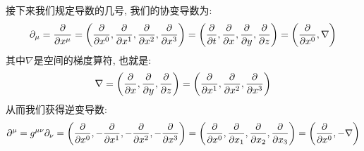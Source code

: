 接下来我们规定导数的几号, 我们的协变导数为:
\begin{equation}
  \partial_\mu = \frac{\partial}{\partial x^\mu} = \left( \frac{\partial}{\partial x^0}, \frac{\partial}{\partial x^1}, \frac{\partial}{\partial x^2}, \frac{\partial}{\partial x^3} \right) = \left( \frac{\partial}{\partial t}, \frac{\partial}{\partial x}, \frac{\partial}{\partial y}, \frac{\partial}{\partial z} \right) = \left(\pdv{}{x^0}, \nabla\right)
\end{equation}
其中$\nabla$是空间的梯度算符, 也就是:
\begin{equation}
  \nabla = \left( \frac{\partial}{\partial x}, \frac{\partial}{\partial y}, \frac{\partial}{\partial z} \right) = \left( \pdv{}{x^1}, \pdv{}{x^2}, \pdv{}{x^3} \right)
\end{equation}
从而我们获得逆变导数:
\begin{equation}
  \partial^\mu = g^{\mu\nu} \partial_\nu = \left( \frac{\partial}{\partial x^0}, -\frac{\partial}{\partial x^1}, -\frac{\partial}{\partial x^2}, -\frac{\partial}{\partial x^3} \right)= \left( \pdv{}{x^0}, \pdv{}{x_1}, \pdv{}{x_2}, \pdv{}{x_3} \right) = \left( \pdv{}{x^0}, -\nabla \right) 
\end{equation}


